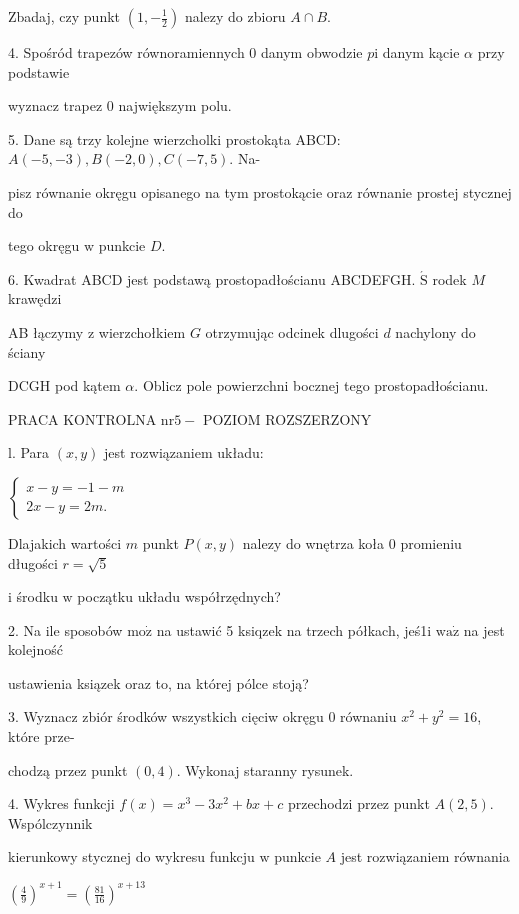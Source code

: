 \documentclass[a4paper,12pt]{article}
\begin{document}
Zbadaj, czy punkt $(1,-\displaystyle \frac{1}{2})$ nalezy do zbioru $A\cap B.$

4. Spośród trapezów równoramiennych $0$ danym obwodzie $p\mathrm{i}$ danym kącie $\alpha$ przy podstawie

wyznacz trapez $0$ największym polu.

5. Dane są trzy kolejne wierzcholki prostokąta ABCD: $A(-5,-3), B(-2,0), C(-7,5)$. Na-

pisz równanie okręgu opisanego na tym prostokącie oraz równanie prostej stycznej do

tego okręgu $\mathrm{w}$ punkcie $D.$

6. Kwadrat ABCD jest podstawą prostopadłościanu ABCDEFGH. $\acute{\mathrm{S}}$ rodek $M$ krawędzi

AB łączymy $\mathrm{z}$ wierzchołkiem $G$ otrzymując odcinek dlugości $d$ nachylony do ściany

DCGH pod kątem $\alpha$. Oblicz pole powierzchni bocznej tego prostopadłościanu.




PRACA KONTROLNA $\mathrm{n}\mathrm{r} 5-$ POZIOM ROZSZERZONY

l. Para $(x,y)$ jest rozwiązaniem układu:

$\left\{\begin{array}{l}
x-y=-1-m\\
2x-y=2m.
\end{array}\right.$

Dlajakich wartości $m$ punkt $P(x,y)$ nalezy do wnętrza koła $0$ promieniu długości $r=\sqrt{5}$

$\mathrm{i}$ środku $\mathrm{w}$ początku układu współrzędnych?

2. Na ile sposobów $\mathrm{m}\mathrm{o}\dot{\mathrm{z}}$ na ustawić 5 ksiqzek na trzech półkach, jeś1i $\mathrm{w}\mathrm{a}\dot{\mathrm{z}}$ na jest kolejność

ustawienia ksiązek oraz to, na której pólce stoją?

3. Wyznacz zbiór środków wszystkich cięciw okręgu $0$ równaniu $x^{2}+y^{2}=16$, które prze-

chodzą przez punkt $(0,4)$. Wykonaj staranny rysunek.

4. Wykres funkcji $f(x)=x^{3}-3x^{2}+bx+c$ przechodzi przez punkt $A(2,5)$. Wspólczynnik

kierunkowy stycznej do wykresu funkcju $\mathrm{w}$ punkcie $A$ jest rozwiązaniem równania

$(\displaystyle \frac{4}{9})^{x+1}=(\frac{81}{16})^{x+13}$
\end{document}
